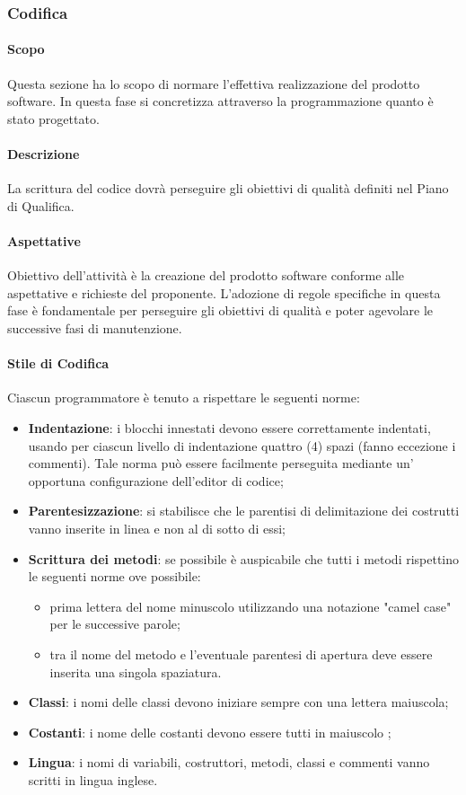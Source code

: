 \subsubsection{Codifica}
\paragraph{Scopo}
Questa sezione ha lo scopo di normare l'effettiva realizzazione del prodotto software.  In questa fase si concretizza attraverso la programmazione quanto è stato progettato.

\paragraph{Descrizione}
La scrittura del codice dovrà perseguire gli obiettivi di qualità definiti nel Piano di Qualifica.

\paragraph{Aspettative}
Obiettivo dell'attività è la creazione del prodotto software conforme alle aspettative e richieste del proponente.  L'adozione di regole specifiche in questa fase è fondamentale per perseguire gli obiettivi di qualità e poter agevolare le successive fasi di manutenzione.

\paragraph{Stile di Codifica}
Ciascun programmatore è tenuto a rispettare le seguenti norme:

\begin{itemize}
\item \textbf{Indentazione}: i blocchi innestati devono essere correttamente indentati, usando per ciascun livello di indentazione quattro (4) spazi (fanno eccezione i commenti).  Tale norma può essere facilmente perseguita mediante un' opportuna configurazione dell'editor di codice;
\item \textbf{Parentesizzazione}: si stabilisce che le parentisi di delimitazione dei costrutti vanno inserite in linea e non al di sotto di essi;
\item \textbf{Scrittura dei metodi}: se possibile è auspicabile che tutti i metodi rispettino le seguenti norme ove possibile:
\begin{itemize}
\item prima lettera del nome minuscolo utilizzando una notazione "camel case" per le successive parole;
\item tra il nome del metodo e l'eventuale parentesi di apertura deve essere inserita una singola spaziatura.
\end{itemize}
\item \textbf{Classi}: i nomi delle classi devono iniziare sempre con una lettera maiuscola;
\item \textbf{Costanti}: i nome delle costanti devono essere tutti in maiuscolo ;
\item \textbf{Lingua}: i nomi di variabili, costruttori, metodi, classi e commenti vanno scritti in lingua inglese.
\end{itemize}




